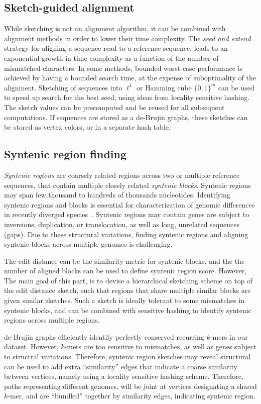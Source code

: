 \subsection{Sketch-guided alignment}
While sketching is not an alignment algorithm, it can be combined with alignment methods in order to lower their time complexity. The \emph{seed and extend} strategy for aligning a sequence read to a reference sequence, leads to an exponential growth in time complexity as a function of the number of mismatched characters. In some methods, bounded worst-case performance is achieved by having a bounded search time, at the expense of suboptimality of the alignment. 
Sketching of sequences into $\ell^1$ or Hamming cube $\{0,1\}^m$ can be used to speed up search for the best seed, using ideas from locality sensitive hashing. 
The sketch values can be precomputed and be reused for all subsequent computations. If sequences are stored as a de-Brujin graphs, these sketches can be stored as vertex colors, or in a separate hash table.  


 

\subsection{Syntenic region finding}
\emph{Syntenic regions} are coarsely related regions across two or multiple reference sequences, that contain multiple closely related \emph{syntenic blocks}. 
Syntenic regions may span few thousand to hundreds of thousands nucleotides. 
Identifying syntenic regions and blocks is essential for characterization of genomic differences in recently diverged species~\cite{vergara2010large}. 
Syntenic regions may contain genes are subject to inversions, duplication, or translocation, as well as long, unrelated sequences (gaps).
Due to these structural variations, finding syntenic regions and aligning syntenic blocks across multiple genomes is challenging.


The edit distance can be the similarity metric for syntenic blocks, and the the number of aligned blocks can be used to define syntenic region score. However, 
The main goal of this part, is to devise a hierarchical sketching scheme on top of the edit distance sketch, such that regions that share multiple similar blocks are given similar sketches. 
Such a sketch is ideally tolerant to some mismatches in syntenic blocks, and can be combined with sensitive hashing to identify  syntenic regions across multiple regions. 

  
de-Brujin graphs efficiently identify perfectly conserved recurring $k$-mers in our dataset. However, $k$-mers are too sensitive to mismatches, as well as genes subject to structral variations. Therefore, syntenic region sketches may reveal structural can be used to add extra ``similarity'' edges that indicate a coarse similarity between vertices, namely using a locality sensitive hashing scheme. Therefore, paths representing different genomes, will be joint at vertices designating a shared $k$-mer, and are ``bundled'' together by similarity edges, indicating syntenic region.


